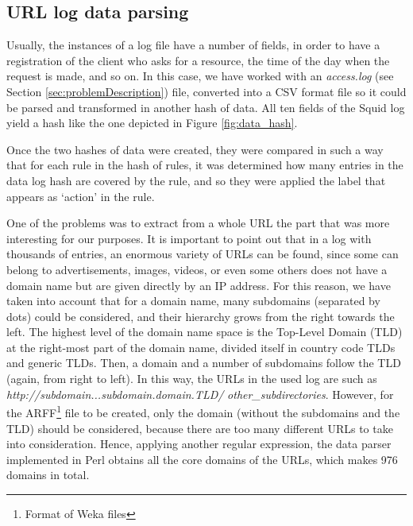 \documentclass{llncs}
\begin{document}
%
\subsection{URL log data parsing}
\label{subsec:logparsing}

\noindent Usually, the instances of a log file have a number of fields, in order to have a registration of the client who asks for a resource, the time of the day when the request is made, and so on. In this case, we have worked with an \textit{access.log} (see Section \ref{sec:problemDescription}) file, converted into a CSV format file so it could be parsed and transformed in another hash of data. All ten fields of the Squid log yield a hash like the one depicted in Figure \ref{fig:data_hash}.

Once the two hashes of data were created, they were compared in such a way that for each rule in the hash of rules, it was determined how many entries in the data log hash are covered by the rule, and so they were applied the label that appears as `action' in the rule.

One of the problems was to extract from a whole URL the part that was
more interesting for our purposes. It is important to point out that
in a log with thousands of entries, an enormous variety of URLs can be
found, since some can belong to advertisements, images, videos, or
even some others does not have a domain name but are given directly by
an IP address. For this reason, we have taken into account that for a
domain name, many subdomains (separated by dots) could be considered,
and their hierarchy grows from the right towards the left. The highest
level of the domain name space is the Top-Level Domain (TLD) at the
right-most part of the domain name, divided itself in country code
TLDs and generic TLDs. Then, a domain and a number of subdomains
follow the TLD (again, from right to left). In this way, the URLs in the
used log are such as \textit{http://subdomain...subdomain.domain.TLD/}
\textit{other\_subdirectories}. However, for the ARFF\footnote{Format
  of Weka files} file to be created, only the domain (without the
subdomains and the TLD) should be considered, because there are too
many different URLs to take into consideration. Hence, applying
another regular expression, the data parser implemented in Perl
obtains all the core domains of the URLs, which makes 976 domains in
total. 
\end{document}
